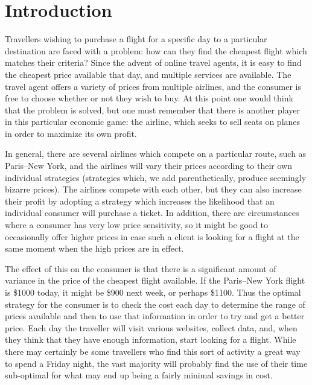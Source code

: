 \documentclass{article}
\title{\thetitle{}}
\author{\theauthors{}}
\begin{document}
\maketitle

\begin{abstract}
  asdfasdfasdf FIXME
\end{abstract}

\section{Introduction}

Travellers wishing to purchase a flight for a specific day to a
particular destination are faced with a problem: how can they find the
cheapest flight which matches their criteria?  Since the advent of
online travel agents, it is easy to find the cheapest price available
that day, and multiple services are available.  The travel agent
offers a variety of prices from multiple airlines, and the consumer is
free to choose whether or not they wish to buy.  At this point one
would think that the problem is solved, but one must remember that
there is another player in this particular economic game: the airline,
which seeks to sell seats on planes in order to maximize its own
profit.

In general, there are several airlines which compete on a particular
route, such as Paris--New York, and the airlines will vary their prices
according to their own individual strategies (strategies which, we add
parenthetically, produce seemingly bizarre prices).  The airlines
compete with each other, but they can also increase their profit by
adopting a strategy which increases the likelihood that an individual
consumer will purchase a ticket.  In addition, there are circumstances
where a consumer has very low price sensitivity, so it might be good
to occasionally offer higher prices in case such a client is looking
for a flight at the same moment when the high prices are in effect.

The effect of this on the consumer is that there is a significant
amount of variance in the price of the cheapest flight available.  If
the Paris--New York flight is \$1000 today, it might be \$900 next
week, or perhaps \$1100.  Thus the optimal strategy for the consumer
is to check the cost each day to determine the range of prices
available and then to use that information in order to try and get a
better price.  Each day the traveller will visit various websites,
collect data, and, when they think that they have enough information,
start looking for a flight.  While there may certainly be some
travellers who find this sort of activity a great way to spend a
Friday night, the vast majority will probably find the use of their
time sub-optimal for what may end up being a fairly minimal savings in
cost.
\end{document}
